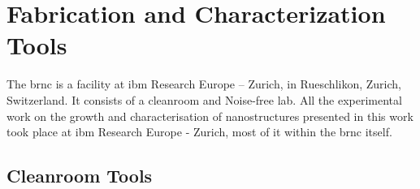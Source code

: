\chapter{Fabrication and Characterization Tools}
\label{chap:tools}

The \acf{brnc} is a facility at \acs{ibm} Research Europe – Zurich, in Rueschlikon, Zurich, Switzerland. It consists of a cleanroom and Noise-free lab. All the experimental work on the growth and characterisation of nanostructures presented in this work took place at \acs{ibm} Research Europe - Zurich, most of it within the \acs{brnc} itself. 

\section{Cleanroom Tools}

